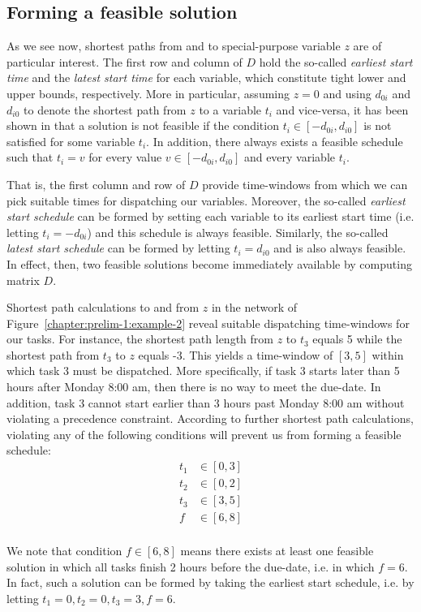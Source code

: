 	\subsection{Forming a feasible solution}

	As we see now, shortest paths from and to special-purpose variable $z$ are of particular interest.
	The first row and column of $D$ hold the so-called \emph{earliest start time} and the \emph{latest start time} for each variable,
	which constitute tight lower and upper bounds, respectively.
	More in particular, assuming $z = 0$ and using $d_{0i}$ and $d_{i0}$ to denote the shortest path from $z$ to a variable $t_i$ and vice-versa,
	it has been shown in \cite{dechter1991} that a solution is not feasible if the condition 
	$t_i \in [-d_{0i}, d_{i0}]$ is not satisfied for some variable $t_i$.
	In addition, there always exists a feasible schedule such that $t_i = v$ for every value $v \in [-d_{0i}, d_{i0}]$ and every variable $t_i$.

	That is, the first column and row of $D$ provide time-windows from which we can pick suitable times for dispatching our variables.
	Moreover, the so-called \emph{earliest start schedule} can be formed by setting each variable to 
	its earliest start time (i.e. letting $t_i = -d_{0i}$) and this schedule is always feasible. 
	Similarly, the so-called \emph{latest start schedule} can be formed by letting $t_i = d_{i0}$ and is also always feasible. 
	In effect, then, two feasible solutions become immediately available by computing matrix $D$.

	\begin{example}
		Shortest path calculations to and from $z$ in the network of Figure~\ref{chapter:prelim-1:example-2}
		reveal suitable dispatching time-windows for our tasks.
		For instance, the shortest path length from $z$ to $t_3$ equals 5 while the shortest path from $t_3$ to $z$ equals -3.
		This yields a time-window of $[3, 5]$ within which task 3 must be dispatched.
		More specifically, if task 3 starts later than 5 hours after Monday 8:00 am, then there is no way to meet the due-date.
		In addition, task 3 cannot start earlier than 3 hours past Monday 8:00 am without violating a precedence constraint.
		According to further shortest path calculations, 
		violating any of the following conditions will prevent us from forming a feasible schedule:
		\begin{align*}
			t_1 & \in [0, 3] \\
			t_2 & \in [0, 2] \\
			t_3 & \in [3, 5] \\
			f & \in [6, 8] \\
		\end{align*}

	We note that condition $f \in [6,8]$ means there exists at least one feasible 
	solution in which all tasks finish 2 hours before the due-date, i.e. in which $f = 6$.
	In fact, such a solution can be formed by taking the earliest start schedule, i.e. by letting $t_1 = 0, t_2 = 0, t_3 = 3, f = 6$.
	\end{example}

